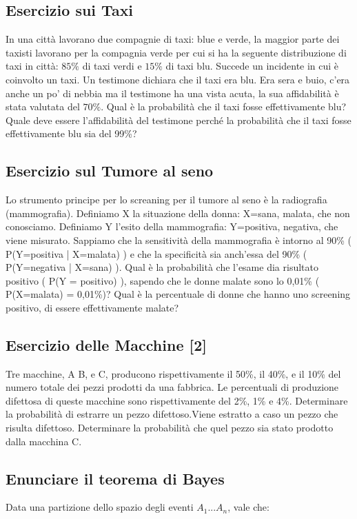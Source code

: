 \documentclass[\main/main.tex]{subfiles}
\begin{document}
\subsection{Esercizio sui Taxi}
In una città lavorano due compagnie di taxi: blue e verde, la maggior parte dei taxisti lavorano per la compagnia verde per cui si ha la seguente distribuzione di taxi in città: $85\%$ di taxi verdi e $15\%$ di taxi blu. Succede un incidente in cui è coinvolto un taxi. Un testimone dichiara che il taxi era blu. Era sera e buio, c'era anche un po' di nebbia ma il testimone ha una vista acuta, la sua affidabilità è stata valutata del $70\%$. Qual è la probabilità che il taxi fosse effettivamente blu? Quale deve essere l'affidabilità del testimone perché la probabilità che il taxi fosse effettivamente blu sia del 99\%?

\subsection{Esercizio sul Tumore al seno}
Lo strumento principe per lo screaning per il tumore al seno è la radiografia (mammografia). Definiamo X la situazione della donna: X={sana, malata}, che non conosciamo. Definiamo Y l'esito della mammografia: Y={positiva, negativa}, che viene misurato. Sappiamo che la sensitività della mammografia è intorno al 90\% ( P(Y=positiva | X=malata) ) e che la specificità sia anch'essa del 90\% ( P(Y=negativa | X=sana) ). Qual è la probabilità che l'esame dia risultato positivo ( P(Y = positivo) ), sapendo che le donne malate sono lo 0,01\% ( P(X=malata) = 0,01\%)? Qual è la percentuale di donne che hanno uno screening positivo, di essere effettivamente malate?

\subsection{Esercizio delle Macchine [2]}
Tre macchine, A B, e C, producono rispettivamente il 50\%, il 40\%, e il 10\% del numero totale dei pezzi prodotti da una fabbrica. Le percentuali di produzione difettosa di queste macchine sono rispettivamente del 2\%, 1\% e 4\%. Determinare la probabilità di estrarre un pezzo difettoso.Viene estratto a caso un pezzo che risulta difettoso. Determinare la probabilità che quel pezzo sia stato prodotto dalla macchina C.

\subsection{Enunciare il teorema di Bayes}
Data una partizione dello spazio degli eventi $A_1...A_n$, vale che:
\end{document}
